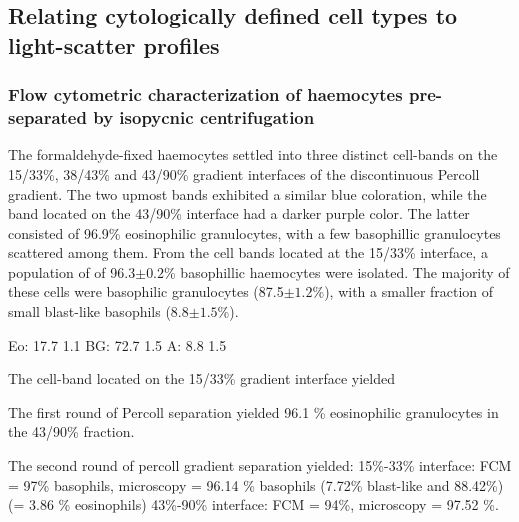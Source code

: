 \subsection{Relating cytologically defined cell types to light-scatter profiles}


\subsubsection{Flow cytometric characterization of haemocytes pre-separated by isopycnic centrifugation }
The formaldehyde-fixed haemocytes settled into three distinct cell-bands on the 15/33\%, 38/43\% and 43/90\% gradient interfaces of the discontinuous Percoll gradient. The two upmost bands exhibited a similar blue coloration, while the band located on the 43/90\% interface had a darker purple color. The latter consisted of 96.9\% eosinophilic granulocytes, with a few basophillic granulocytes scattered among them. From the cell bands located at the 15/33\% interface, a population of of 96.3$\pm{0.2}$\% basophillic haemocytes were isolated. The majority of these cells were basophilic granulocytes (87.5$\pm{1.2}$\%), with a smaller fraction of small blast-like basophils (8.8$\pm{1.5}$\%).


Eo: 17.7 1.1
BG: 72.7 1.5
A:   8.8 1.5



The cell-band located on the 15/33\% gradient interface yielded

The first round of Percoll separation yielded 96.1 \% eosinophilic granulocytes in the 43/90\% fraction.

The second round of percoll gradient separation yielded: 15\%-33\% interface: FCM = 97\% basophils, microscopy = 96.14 \% basophils (7.72\% blast-like and 88.42\%) (= 3.86 \% eosinophils) 43\%-90\% interface: FCM = 94\%, microscopy = 97.52 \%.


